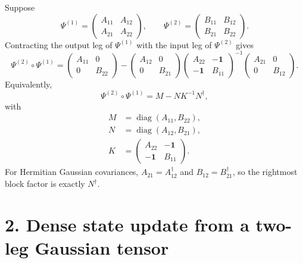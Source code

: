 \documentclass[11pt]{article}
\newcommand{\I}{\mathbf{1}}
\begin{document}
Suppose
\begin{equation}
\Psi^{(1)} =
\begin{pmatrix}
A_{11} & A_{12} \\
A_{21} & A_{22}
\end{pmatrix},
\qquad
\Psi^{(2)} =
\begin{pmatrix}
B_{11} & B_{12} \\
B_{21} & B_{22}
\end{pmatrix}.
\end{equation}
Contracting the output leg of $\Psi^{(1)}$ with the input leg of $\Psi^{(2)}$
gives
\begin{equation}
\Psi^{(2)} \circ \Psi^{(1)}
=
\begin{pmatrix}
A_{11} & 0 \\
0 & B_{22}
\end{pmatrix}
-
\begin{pmatrix}
A_{12} & 0 \\
0 & B_{21}
\end{pmatrix}
\begin{pmatrix}
A_{22} & -\I \\
-\I & B_{11}
\end{pmatrix}^{-1}
\begin{pmatrix}
A_{21} & 0 \\
0 & B_{12}
\end{pmatrix}.
\label{eq:composechoi}
\end{equation}
Equivalently,
\begin{equation}
\Psi^{(2)} \circ \Psi^{(1)} = M - N K^{-1} N^\dagger,
\end{equation}
with
\begin{align}
M &= \operatorname{diag}(A_{11}, B_{22}), \\
N &= \operatorname{diag}(A_{12}, B_{21}), \\
K &=
\begin{pmatrix}
A_{22} & -\I \\
-\I & B_{11}
\end{pmatrix}.
\end{align}
For Hermitian Gaussian covariances, $A_{21} = A_{12}^\dagger$ and
$B_{12} = B_{21}^\dagger$, so the rightmost block factor is exactly
$N^\dagger$.

\section*{2. Dense state update from a two-leg Gaussian tensor}
\end{document}
